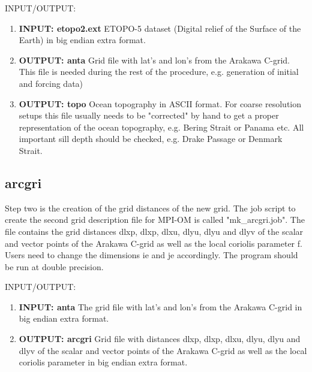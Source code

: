 INPUT/OUTPUT:
\begin{enumerate}

\item \textbf{INPUT: etopo2.ext} \newline
ETOPO-5 dataset (Digital relief of the
Surface of the Earth) in big endian extra format.

\item \textbf{OUTPUT: anta} \newline
Grid file with lat's  and lon's from the Arakawa C-grid. This file is
needed during the rest of the procedure, e.g. generation of initial and forcing data)

\item \textbf{OUTPUT: topo} \newline
Ocean topography in ASCII format. 
For coarse resolution setups this file usually needs to be "corrected"
by hand to get a proper representation of the ocean topography,
e.g. Bering Strait or Panama etc. All important sill depth should be
checked, e.g. Drake Passage or Denmark Strait.
\end{enumerate}


\subsection{arcgri}

Step two is the creation of the grid distances of the new grid.
The job script to create the second grid description file for MPI-OM 
is called "mk\_arcgri.job".
The file contains the grid distances dlxp, dlxp, dlxu, dlyu, dlyu and dlyv of
the scalar and vector points of the Arakawa C-grid as well as the
local coriolis parameter f.
Users need to change the dimensions ie and je accordingly. The 
program should be run at double precision.

INPUT/OUTPUT:
\begin{enumerate}

\item \textbf{INPUT: anta} \newline
The grid file with lat's  and lon's from the Arakawa C-grid
in big endian extra format.

\item \textbf{OUTPUT: arcgri} \newline
Grid file with distances dlxp, dlxp, dlxu, dlyu, dlyu and dlyv of
the scalar and vector points of the Arakawa C-grid as well as the
local coriolis parameter in big endian extra format.

\end{enumerate}


